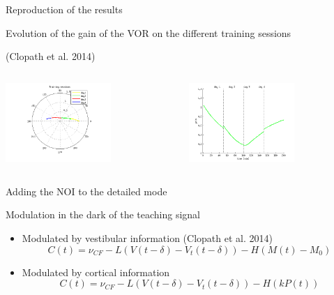 \documentclass[ignorenonframetext,]{beamer}
\begin{document}
\begin{frame}{Reproduction of the results}

Evolution of the gain of the VOR on the different training sessions

(Clopath et al. 2014)

\begin{columns}[T]
\begin{column}[T]{5cm}
\includegraphics[height=3cm]{images/report_03.png}
\end{column}
\begin{column}[T]{5cm}
\includegraphics[height=3cm]{images/report_06.png}
\end{column}
\end{columns}

\end{frame}

\begin{frame}{Adding the NOI to the detailed mode}

Modulation in the dark of the teaching signal

\begin{itemize}
\item
  Modulated by vestibular information (Clopath et al. 2014)
  \[C(t) = \nu_{CF} - L(V(t- \delta) - V_t(t-\delta)) - H(M(t) - M_0)\]
\item
  Modulated by cortical information
  \[C(t) = \nu_{CF} - L(V(t- \delta) - V_t(t-\delta)) - H(kP(t))\]
\end{itemize}

\end{frame}
\end{document}
